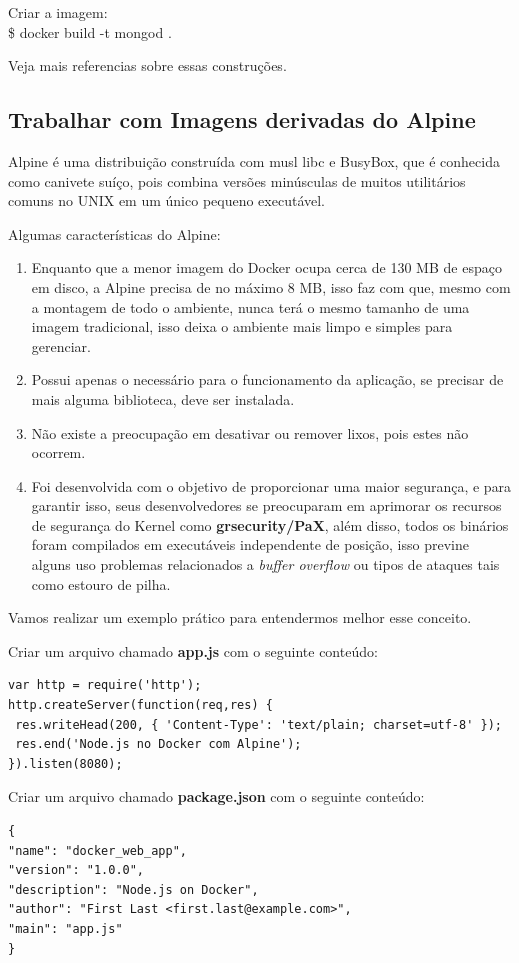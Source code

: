 \documentclass[a4paper,11pt]{article}
\begin{document}
Criar a imagem: \\
{\ttfamily\$ docker build -t mongod .}

Veja mais referencias sobre essas construções\cite{constimagem}.

\subsection{Trabalhar com Imagens derivadas do Alpine}
Alpine é uma distribuição construída com musl libc e BusyBox, que é conhecida como canivete suíço, pois combina versões minúsculas de muitos utilitários comuns no UNIX em um único pequeno executável.

Algumas características do Alpine:
\begin{enumerate}
  \item Enquanto que a menor imagem do Docker ocupa cerca de 130 MB de espaço em disco, a Alpine precisa de no máximo 8 MB, isso faz com que, mesmo com a montagem de todo o ambiente, nunca terá o mesmo tamanho de uma imagem tradicional, isso deixa o ambiente mais limpo e simples para gerenciar.
  \item Possui apenas o necessário para o funcionamento da aplicação, se precisar de mais alguma biblioteca, deve ser instalada.
  \item Não existe a preocupação em desativar ou remover lixos, pois estes não ocorrem.
  \item Foi desenvolvida com o objetivo de proporcionar uma maior segurança, e para garantir isso, seus desenvolvedores se preocuparam em aprimorar os recursos de segurança do Kernel como \textbf{grsecurity/PaX}, além disso, todos os binários foram compilados em executáveis independente de posição, isso previne alguns uso problemas relacionados a \textit{buffer overflow} ou tipos de ataques tais como estouro de pilha.
\end{enumerate}

Vamos realizar um exemplo prático para entendermos melhor esse conceito.

Criar um arquivo chamado \textbf{app.js} com o seguinte conteúdo:
\begin{lstlisting}
var http = require('http');
http.createServer(function(req,res) {
 res.writeHead(200, { 'Content-Type': 'text/plain; charset=utf-8' });
 res.end('Node.js no Docker com Alpine');
}).listen(8080);
\end{lstlisting}

Criar um arquivo chamado \textbf{package.json} com o seguinte conteúdo:
\begin{lstlisting}
{
"name": "docker_web_app",
"version": "1.0.0",
"description": "Node.js on Docker",
"author": "First Last <first.last@example.com>",
"main": "app.js"
}
\end{lstlisting}
\end{document}
